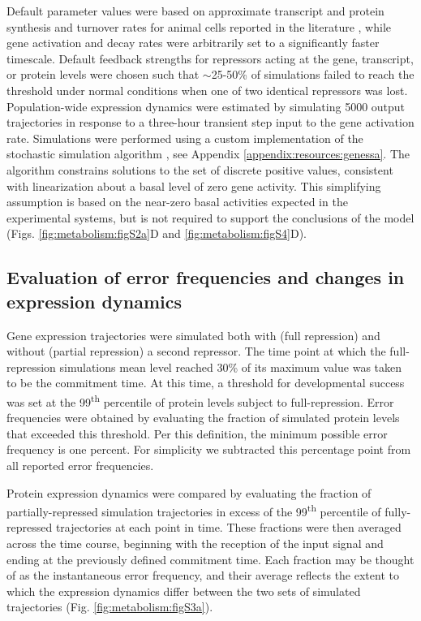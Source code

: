 Default parameter values were based on approximate transcript and protein synthesis and turnover rates for animal cells reported in the literature \cite{Milo2016}, while gene activation and decay rates were arbitrarily set to a significantly faster timescale. Default feedback strengths for repressors acting at the gene, transcript, or protein levels were chosen such that $\sim$25-50\% of simulations failed to reach the threshold under normal conditions when one of two identical repressors was lost. Population-wide expression dynamics were estimated by simulating 5000 output trajectories in response to a three-hour transient step input to the gene activation rate. Simulations were performed using a custom implementation of the stochastic simulation algorithm \cite{Gillespie1977}, see Appendix \ref{appendix:resources:genessa}. The algorithm constrains solutions to the set of discrete positive values, consistent with linearization about a basal level of zero gene activity. This simplifying assumption is based on the near-zero basal activities expected in the experimental systems, but is not required to support the conclusions of the model (Figs. \ref{fig:metabolism:figS2a}D and \ref{fig:metabolism:figS4}D).

\subsection{Evaluation of error frequencies and changes in expression dynamics}
\label{metabolism:methods:overexpression}

Gene expression trajectories were simulated both with (full repression) and without (partial repression) a second repressor. The time point at which the full-repression simulations mean level reached 30\% of its maximum value was taken to be the commitment time. At this time, a threshold for developmental success was set at the 99\textsuperscript{th} percentile of protein levels subject to full-repression. Error frequencies were obtained by evaluating the fraction of simulated protein levels that exceeded this threshold. Per this definition, the minimum possible error frequency is one percent. For simplicity we subtracted this percentage point from all reported error frequencies.

Protein expression dynamics were compared by evaluating the fraction of partially-repressed simulation trajectories in excess of the 99\textsuperscript{th} percentile of fully-repressed trajectories at each point in time. These fractions were then averaged across the time course, beginning with the reception of the input signal and ending at the previously defined commitment time. Each fraction may be thought of as the instantaneous error frequency, and their average reflects the extent to which the expression dynamics differ between the two sets of simulated trajectories (Fig. \ref{fig:metabolism:figS3a}).

